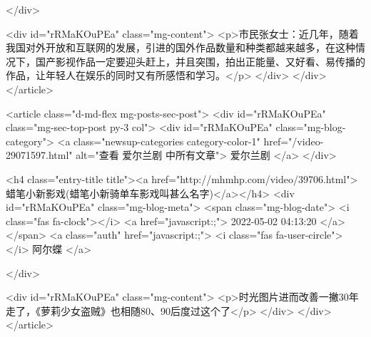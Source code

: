                                             </div>


                                            <div id="rRMaKOuPEa"  class="mg-content">
                                                <p>市民张女士：近几年，随着我国对外开放和互联网的发展，引进的国外作品数量和种类都越来越多，在这种情况下，国产影视作品一定要迎头赶上，并且突围，拍出正能量、又好看、易传播的作品，让年轻人在娱乐的同时又有所感悟和学习。</p>
                                            </div>
                                        </div>
                                    </article>
                                    
                                    <article class="d-md-flex mg-posts-sec-post">
                                        <div id="rRMaKOuPEa"  class="mg-sec-top-post py-3 col">
                                            <div id="rRMaKOuPEa"  class="mg-blog-category">
                                                <a class="newsup-categories category-color-1" href="/video-29071597.html" alt="查看 爱尔兰剧 中所有文章">
                                                    爱尔兰剧
                                                </a>
                                            </div>

                                            <h4 class="entry-title title"><a href="http://mhmhp.com/video/39706.html">蜡笔小新影戏(蜡笔小新骑单车影戏叫甚么名字)</a></h4>
                                            <div id="rRMaKOuPEa"  class="mg-blog-meta">
                                                <span class="mg-blog-date">
                                                    <i class="fas fa-clock"></i>
                                                    <a href="javascript:;">
                                                        2022-05-02 04:13:20
                                                    </a>
                                                </span>
                                                <a class="auth" href="javascript:;">
                                                    <i class="fas fa-user-circle"></i>
                                                    阿尔蝶
                                                </a>

                                            </div>


                                            <div id="rRMaKOuPEa"  class="mg-content">
                                                <p>时光图片进而改善一撇30年走了，《萝莉少女盗贼》也相随80、90后度过这个了</p>
                                            </div>
                                        </div>
                                    </article>
                                    
